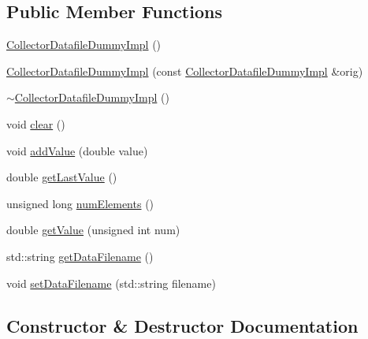 \subsection*{Public Member Functions}
\begin{DoxyCompactItemize}
\item 
\hyperlink{class_collector_datafile_dummy_impl_a7ce0478aa682707efd786bea24536d2a}{Collector\+Datafile\+Dummy\+Impl} ()
\item 
\hyperlink{class_collector_datafile_dummy_impl_adfef3c2f2f37459cde3ea8f33030ae49}{Collector\+Datafile\+Dummy\+Impl} (const \hyperlink{class_collector_datafile_dummy_impl}{Collector\+Datafile\+Dummy\+Impl} \&orig)
\item 
\hyperlink{class_collector_datafile_dummy_impl_adafa9e9381c53566ad99fb72ae221f09}{$\sim$\+Collector\+Datafile\+Dummy\+Impl} ()
\item 
void \hyperlink{class_collector_datafile_dummy_impl_a752997589537d0a995da508194fabf7d}{clear} ()
\item 
void \hyperlink{class_collector_datafile_dummy_impl_abf282948e13154ca6a0222508b81c78b}{add\+Value} (double value)
\item 
double \hyperlink{class_collector_datafile_dummy_impl_a8016186fea2815530de9dfa77e9d69ac}{get\+Last\+Value} ()
\item 
unsigned long \hyperlink{class_collector_datafile_dummy_impl_a08cb7f0324844c744b41068ba1bf8d7a}{num\+Elements} ()
\item 
double \hyperlink{class_collector_datafile_dummy_impl_a84eb10b49223b402897c466f93dc1bcf}{get\+Value} (unsigned int num)
\item 
std\+::string \hyperlink{class_collector_datafile_dummy_impl_a33a261f553b05c9c39aa46e1222e4918}{get\+Data\+Filename} ()
\item 
void \hyperlink{class_collector_datafile_dummy_impl_aa2f236e5351f9a438aa7cf8734623758}{set\+Data\+Filename} (std\+::string filename)
\end{DoxyCompactItemize}


\subsection{Constructor \& Destructor Documentation}
